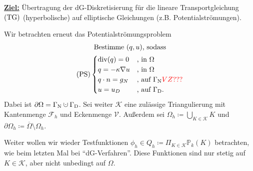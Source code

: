 
\underline{\textbf{Ziel:}} Übertragung der dG-Diskretisierung für die lineare Transportgleichung $ \operatorname{(TG)} $ (hyperbolische) auf elliptische Gleichungen (z.B. Potentialströmungen).

Wir betrachten erneut das Potentialströmungsproblem
\begin{gather*}
	\text{Bestimme } (q, u) \text{, sodass}\\
	\operatorname{(PS)} \begin{cases}
		\operatorname{div}(q) = 0 &\text{, in }\Omega\\
		q = - \kappa \nabla u &\text{, in } \Omega\\
		q \cdot n = g_N &\text{, auf }\Gamma_{\text{N}}  \textcolor{red}{   VZ???} \\
		u = u_D &\text{, auf } \Gamma_{\text{D}}. 
	\end{cases}
\end{gather*}
Dabei ist $ \partial \Omega = \GammaN \cupdot \GammaD $. Sei weiter $ \mathcal{K} $ eine zulässige Triangulierung mit Kantenmenge $ \mathcal{F}_h $ und Eckenmenge $ \mathcal{V} $. Außerdem sei $ \Omega_h \coloneqq \bigcup_{K \in \mathcal{K}} K$ und $ \partial \Omega_h \coloneqq \overline{\Omega} \setminus \Omega_h $.

Weiter wollen wir wieder Testfunktionen $ \phi_h \in Q_h \coloneqq \Pi_{K \in \mathcal{K}} \mathbb{P}_k(K)$ betrachten, wie beim letzten Mal bei \enquote{dG-Verfahren}. Diese Funktionen sind nur stetig auf $ K \in \mathcal{K} $, aber nicht unbedingt auf $ \Omega $. 


